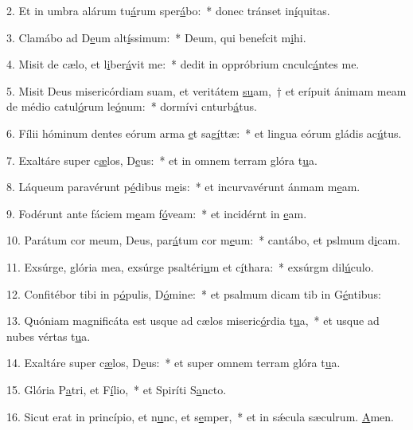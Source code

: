 2. Et in umbra alárum tu\uline{á}rum sper\uline{á}bo:~* donec tránset in\uline{í}quitas.\par 
3. Clamábo ad D\uline{e}um alt\uline{í}ssimum:~* Deum, qui benefcit m\uline{i}hi.\par 
4. Misit de cælo, et l\uline{i}ber\uline{á}vit me:~* dedit in oppróbrium cnculc\uline{á}ntes me.\par 
5. Misit Deus misericórdiam suam, et veritátem \uline{su}am,~† et erípuit ánimam meam de médio catul\uline{ó}rum le\uline{ó}num:~* dormívi cnturb\uline{á}tus.\par 
6. Fílii hóminum dentes eórum arma \uline{e}t sag\uline{í}ttæ:~* et lingua eórum gládis ac\uline{ú}tus.\par 
7. Exaltáre super c\uline{æ}los, D\uline{e}us:~* et in omnem terram glóra t\uline{u}a.\par 
8. Láqueum paravérunt p\uline{é}dibus m\uline{e}is:~* et incurvavérunt ánmam m\uline{e}am.\par 
9. Fodérunt ante fáciem m\uline{e}am f\uline{ó}veam:~* et incidérnt in \uline{e}am.\par 
10. Parátum cor meum, Deus, par\uline{á}tum cor m\uline{e}um:~* cantábo, et pslmum d\uline{i}cam.\par 
11. Exsúrge, glória mea, exsúrge psaltéri\uline{u}m et c\uline{í}thara:~* exsúrgm dil\uline{ú}culo.\par 
12. Confitébor tibi in p\uline{ó}pulis, D\uline{ó}mine:~* et psalmum dicam tib in G\uline{é}ntibus:\par 
13. Quóniam magnificáta est usque ad cælos miseric\uline{ó}rdia t\uline{u}a,~* et usque ad nubes vértas t\uline{u}a.\par 
14. Exaltáre super c\uline{æ}los, D\uline{e}us:~* et super omnem terram glóra t\uline{u}a.\par 
15. Glória P\uline{a}tri, et F\uline{í}lio,~* et Spiríti S\uline{a}ncto.\par 
16. Sicut erat in princípio, et n\uline{u}nc, et s\uline{e}mper,~* et in sǽcula sæculrum. \uline{A}men.\par 
